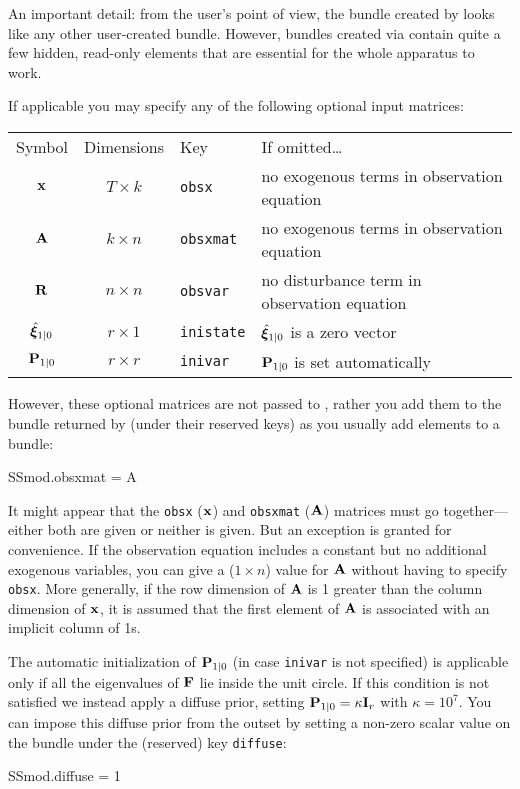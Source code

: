 \documentclass[a4paper]{article}
\begin{document}
An important detail: from the user's point of view, the bundle created
by  looks like any other user-created bundle. However,
bundles created via  contain quite a few hidden,
read-only elements that are essential for the whole apparatus to work.

If applicable you may specify any of the following optional input
matrices:

\begin{center}
\begin{tabular}{ccll}
Symbol & Dimensions & Key & If omitted\dots \\[6pt]
$\mathbf{x}$ & $T \times k$ & \texttt{obsx} &
 no exogenous terms in observation equation\\
$\mathbf{A}$ & $k \times n$ & \texttt{obsxmat} &
 no exogenous terms in observation equation\\ 
$\mathbf{R}$ & $n \times n$ & \texttt{obsvar} & 
 no disturbance term in observation equation \\
$\hat{\bm{\xi}}_{1|0}$ & $r \times 1$ & \texttt{inistate} &
 $\hat{\bm{\xi}}_{1|0}$ is a zero vector\\
$\mathbf{P}_{1|0}$ & $r \times r$ & \texttt{inivar} &
 $\mathbf{P}_{1|0}$ is set automatically
\end{tabular}
\end{center}

However, these optional matrices are not passed to ,
rather you add them to the bundle returned by  (under
their reserved keys) as you usually add elements to a bundle:
\begin{code}
SSmod.obsxmat = A
\end{code}

It might appear that the \texttt{obsx} ($\mathbf{x}$) and \texttt{obsxmat}
($\mathbf{A}$) matrices must go together---either both are given or
neither is given.  But an exception is granted for convenience.  If
the observation equation includes a constant but no additional
exogenous variables, you can give a ($1 \times n$) value for
$\mathbf{A}$ without having to specify \texttt{obsx}.  More generally,
if the row dimension of $\mathbf{A}$ is 1 greater than the column
dimension of $\mathbf{x}$, it is assumed that the first element of
$\mathbf{A}$ is associated with an implicit column of 1s.

The automatic initialization of $\mathbf{P}_{1|0}$ (in case
\texttt{inivar} is not specified) is applicable only if all the
eigenvalues of $\mathbf{F}$ lie inside the unit circle.  If this
condition is not satisfied we instead apply a diffuse prior, setting
$\mathbf{P}_{1|0} = \kappa \mathbf{I}_r$ with $\kappa = 10^7$.  You can
impose this diffuse prior from the outset by setting a non-zero scalar
value on the bundle under the (reserved) key \texttt{diffuse}:
%
\begin{code}
SSmod.diffuse = 1
\end{code}
\end{document}
